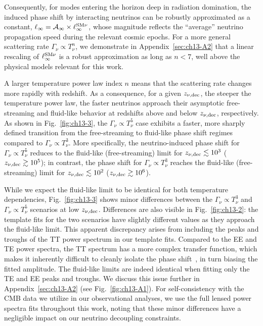 Consequently, for modes entering the horizon deep in radiation domination, the induced phase shift by interacting neutrinos can be robustly approximated as a constant, $\ell_\infty=\mathcal{A}_\infty \times \ell^{\rm SM\nu}_\infty$, whose magnitude reflects the ``average'' neutrino propagation speed during the relevant cosmic epochs. For a more general scattering rate $\Gamma_\nu\propto T_\nu^n$, we demonstrate in Appendix~\ref{sec:ch13-A2} that a linear rescaling of $\ell^{\rm SM\nu}_\infty$ is a robust approximation as long as $n<7$, well above the physical models relevant for this work.

A larger temperature power law index $n$ means that the scattering rate changes more rapidly with redshift. As a consequence, for a given $z_{\nu,\rm dec}$, the steeper the temperature power law, the faster neutrinos approach their asymptotic free-streaming and fluid-like behavior at redshifts above and below $z_{\nu,\rm dec}$, respectively. As shown in Fig.~\ref{fig:ch13-3}, the $\Gamma_\nu \propto T_\nu^5$ case exhibits a faster, more sharply defined transition from the free-streaming to fluid-like phase shift regimes compared to $\Gamma_\nu \propto T_\nu^3$. More specifically, the neutrino-induced phase shift for $\Gamma_\nu \propto T_\nu^5$ reduces to the fluid-like (free-streaming) limit for $z_{\nu,\rm dec}\lesssim 10^{3}$  ($z_{\nu,\rm dec}\gtrsim10^{5}$); in contrast, the phase shift for $\Gamma_\nu \propto T_\nu^3$ reaches the fluid-like (free-streaming) limit for $z_{\nu,\rm dec}\lesssim 10^{2}$  ($z_{\nu,\rm dec}\gtrsim10^{6}$).

While we expect the fluid-like limit to be identical for both temperature dependencies, Fig.~\ref{fig:ch13-3} shows minor differences between the $\Gamma_\nu \propto T_\nu^3$ and $\Gamma_\nu \propto T_\nu^5$ scenarios at low $z_{\nu,\rm dec}$. Differences are also visible in Fig.~\ref{fig:ch13-2}: the template fits for the two scenarios have slightly different values as they approach the fluid-like limit. This apparent discrepancy arises from including the peaks and troughs of the TT power spectrum in our template fits. Compared to the EE and TE power spectra, the TT spectrum has a more complex transfer function, which makes it inherently difficult to cleanly isolate the phase shift~\cite{Montefalcone:2025unv}, in turn biasing the fitted amplitude. The fluid-like limits are indeed identical when fitting only the TE and EE peaks and troughs.
We discuss this issue further in Appendix~\ref{sec:ch13-A2} (see Fig.~\ref{fig:ch13-A1}). For self-consistency with the CMB data we utilize in our observational analyses, we use the full lensed power spectra fits throughout this work, noting that these minor differences have a negligible impact on our neutrino decoupling constraints.


